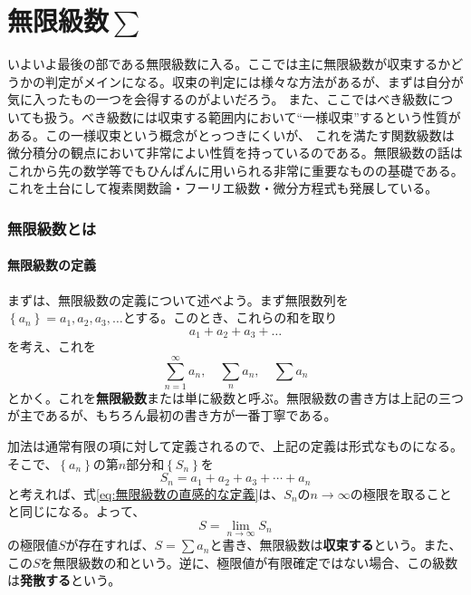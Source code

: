 \documentclass[a4j,dvipdfmx]{jsarticle}
\begin{document}
    \part{無限級数$\sum$}
    \begin{screen}
        いよいよ最後の部である無限級数に入る。ここでは主に無限級数が収束するかどうかの判定がメインになる。収束の判定には様々な方法があるが、まずは自分が気に入ったもの一つを会得するのがよいだろう。
        また、ここではべき級数についても扱う。べき級数には収束する範囲内において``一様収束''するという性質がある。この一様収束という概念がとっつきにくいが、
        これを満たす関数級数は微分積分の観点において非常によい性質を持っているのである。無限級数の話はこれから先の数学等でもひんぱんに用いられる非常に重要なものの基礎である。
        これを土台にして複素関数論・フーリエ級数・微分方程式も発展している。
    \end{screen}
    \clearpage
        \section{無限級数とは}
            \subsection{無限級数の定義}
                まずは、無限級数の定義について述べよう。まず無限数列を$\left\{a_n\right\}=a_1,a_2,a_3,\dots$とする。このとき、これらの和を取り
                \begin{equation}
                    a_1+a_2+a_3+\dots \label{eq:無限級数の直感的な定義}
                \end{equation}
                を考え、これを
                \begin{equation}
                    \sum_{n=1}^{\infty}a_n,\quad \sum_{n} a_n,\quad \sum a_n \label{eq:無限級数の書き方}
                \end{equation}
                とかく。これを\textbf{無限級数}または単に級数と呼ぶ。無限級数の書き方は上記の三つが主であるが、もちろん最初の書き方が一番丁寧である。

                加法は通常有限の項に対して定義されるので、上記の定義は形式なものになる。そこで、$\left\{a_n\right\}$の第$n$部分和$\left\{S_n\right\}$を
                \begin{equation*}
                    S_n = a_1+a_2+a_3+\cdots+a_n
                \end{equation*}
                と考えれば、式\eqref{eq:無限級数の直感的な定義}は、$S_n$の$n\to \infty$の極限を取ることと同じになる。よって、
                \begin{equation}
                    S=\lim_{n\to \infty}S_n
                \end{equation}
                の極限値$S$が存在すれば、$S=\sum a_n$と書き、無限級数は\textbf{収束する}という。また、この$S$を無限級数の和という。逆に、極限値が有限確定ではない場合、この級数は\textbf{発散する}という。\\
\end{document}
